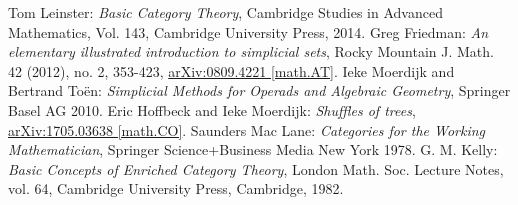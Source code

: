 \documentclass[11pt,a4paper,openright,oneside]{article}
\numberwithin{equation}{section}
\theoremstyle{definition}
\begin{document}





\newpage
\begin{thebibliography}{4}
     Tom Leinster: \textit{Basic Category Theory}, Cambridge Studies in Advanced Mathematics, Vol. 143, Cambridge University Press, 2014. 
     Greg Friedman: \textit{An elementary illustrated introduction to simplicial sets}, Rocky Mountain J. Math. 42 (2012), no. 2, 353-423, \href{https://arxiv.org/abs/0809.4221}{arXiv:0809.4221 [math.AT]}.
     Ieke Moerdijk and Bertrand To\"en: \textit{Simplicial Methods for Operads and Algebraic Geometry}, Springer Basel AG 2010.
     Eric Hoffbeck and Ieke Moerdijk: \textit{Shuffles of trees}, \href{https://arxiv.org/abs/1705.03638}{arXiv:1705.03638 [math.CO]}.
     Saunders Mac Lane: \textit{Categories for the Working Mathematician}, Springer Science+Business Media New York 1978.
     G. M. Kelly: \textit{Basic Concepts of Enriched Category Theory}, London Math. Soc. Lecture Notes, vol. 64, Cambridge University Press, Cambridge, 1982.
\end{thebibliography}
\end{document}
